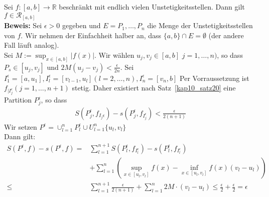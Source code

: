 \begin{Satz}{\label{kap10_satz21}
	Sei $f: [a,b] \rightarrow \mathbb{R}$ beschränkt mit endlich vielen 
	Unstetigkeitsstellen. Dann gilt $f \in \mathcal{R}_{[a,b]}$\\
	\textbf{Beweis:} Sei $\epsilon > 0$ gegeben und $E = {P_1, \hdots, P_n}$
	die Menge der Unstetigkeitsstellen von $f$. Wir nehmen der Einfachheit halber 
	an, dass $\{a,b\} \cap E = \emptyset$ (der andere Fall läuft analog).\\
	Sei $M:= \sup_{x \in [a,b]} \vert f(x) \vert$. Wir wählen $u_j, v_j \in [a,b]$ 
	$j = 1, \hdots, n)$, so dass $P_s \in [u_j, v_j]$ und $2M (u_j - v_j) < 
	\frac{\epsilon}{2n}$. Sei $I_1^{\epsilon} = [a, u_1], I_l^{\epsilon} = [v_{l-1}, 
	u_l] (l = 2, \hdots, n), I_n^{\epsilon} = [v_n, b]$ 
	Per Vorraussetzung ist $f_{\vert I_j^{\epsilon}} (j = 1,\hdots, n+1)$ stetig.
	Daher existiert nach Satz~\ref{kap10_satz20}
	eine Partition $P_j^{\epsilon}$, so dass 
	\begin{align*}
		S(P_j^{\epsilon}, f_{I_j{\epsilon}}) - s(P_j^{\epsilon}, f_{I_j^{\epsilon}}) 
		 < \frac{\epsilon}{2(n+1)}
	\end{align*}
	Wir setzen $P^{\epsilon} = \cup_{l = 1}^n P_l^{\epsilon}
	 \cup U_{l=1}^n\{u_l,v_l\}$\\
	 Dann gilt:
	 \begin{align*}
	 	S(P^{\epsilon},f) - s(P^{\epsilon},f) 
	 	= & \sum_{l=1}^{n+1} S(P_l^{\epsilon},f_{I_l^{\epsilon}}) - 
	 		s(P_l^{\epsilon},f_{I_l^{\epsilon}})  \\
	 		& + \sum_{l = 1}^n \left( \sup_{x \in [u_l, v_l]} 
	 		f(x) - \inf_{x \in [u_l, v_l]} f(x) (v_l - u_l)\right) \\
	 		\leq & \sum_{l=1}^{n+1} \frac{\epsilon}{2(n+1)} + \sum_{l=1}^n
	 			2M \cdot(v_l-u_l) \leq \frac{\epsilon}{2} + \frac{\epsilon}{2} 
	 			= \epsilon
	 \end{align*}	 
}\end{Satz}


